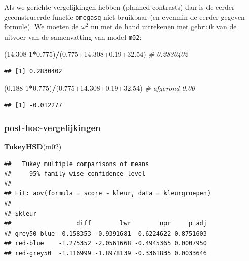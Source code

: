 \documentclass[
]{book}
\newenvironment{Shaded}{\begin{snugshade}}{\end{snugshade}}
\newcommand{\CommentTok}[1]{\textcolor[rgb]{0.56,0.35,0.01}{\textit{#1}}}
\newcommand{\DecValTok}[1]{\textcolor[rgb]{0.00,0.00,0.81}{#1}}
\newcommand{\FloatTok}[1]{\textcolor[rgb]{0.00,0.00,0.81}{#1}}
\newcommand{\KeywordTok}[1]{\textcolor[rgb]{0.13,0.29,0.53}{\textbf{#1}}}
\newcommand{\NormalTok}[1]{#1}
\newcommand{\OperatorTok}[1]{\textcolor[rgb]{0.81,0.36,0.00}{\textbf{#1}}}
\begin{document}
Als we gerichte vergelijkingen hebben (planned contrasts) dan is de eerder geconstrueerde functie \texttt{omegasq} niet bruikbaar (en evenmin de eerder gegeven formule). We moeten de \(\omega^2\) nu met de hand uitrekenen met gebruik van de uitvoer van de samenvatting van model \texttt{m02}:

\begin{Shaded}
\begin{Highlighting}[]
\NormalTok{(}\FloatTok{14.308}\DecValTok{{-}1}\OperatorTok{*}\FloatTok{0.775}\NormalTok{)}\OperatorTok{/}\NormalTok{(}\FloatTok{0.775+14.308+0.19+32.54}\NormalTok{) }\CommentTok{\# 0.2830402}
\end{Highlighting}
\end{Shaded}

\begin{verbatim}
## [1] 0.2830402
\end{verbatim}

\begin{Shaded}
\begin{Highlighting}[]
\NormalTok{(}\FloatTok{0.188}\DecValTok{{-}1}\OperatorTok{*}\FloatTok{0.775}\NormalTok{)}\OperatorTok{/}\NormalTok{(}\FloatTok{0.775+14.308+0.19+32.54}\NormalTok{) }\CommentTok{\# afgerond 0.00}
\end{Highlighting}
\end{Shaded}

\begin{verbatim}
## [1] -0.012277
\end{verbatim}

\hypertarget{post-hoc-vergelijkingen}{%
\subsubsection{post-hoc-vergelijkingen}\label{post-hoc-vergelijkingen}}

\begin{Shaded}
\begin{Highlighting}[]
\KeywordTok{TukeyHSD}\NormalTok{(m02)}
\end{Highlighting}
\end{Shaded}

\begin{verbatim}
##   Tukey multiple comparisons of means
##     95% family-wise confidence level
## 
## Fit: aov(formula = score ~ kleur, data = kleurgroepen)
## 
## $kleur
##                  diff        lwr        upr     p adj
## grey50-blue -0.158353 -0.9391681  0.6224622 0.8751603
## red-blue    -1.275352 -2.0561668 -0.4945365 0.0007950
## red-grey50  -1.116999 -1.8978139 -0.3361835 0.0033646
\end{verbatim}
\end{document}
